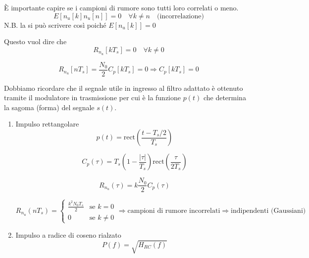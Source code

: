 È importante capire se i campioni di rumore sono tutti loro correlati o meno.
\[
    E[n_u[k]n_u[n]] = 0 \quad \forall k \neq n \quad \text{(incorrelazione)}
\]
N.B. la si può scrivere così poiché
\(E[n_u[k]] = 0\)

Questo vuol dire che
\[
    R_{n_u}[kT_s] = 0 \quad \forall k \neq 0
\]

\[
    R_{n_u}[nT_s] = \frac{N_0}{2} C_p[kT_s] = 0 \Rightarrow C_p[kT_s] = 0
\]


Dobbiamo ricordare che il segnale utile in ingresso al filtro adattato è ottenuto tramite il modulatore in trasmissione per cui è la funzione \( p(t) \) che determina la sagoma (forma) del segnale \( s(t) \).

\begin{enumerate}
    \item Impulso rettangolare
          \[
              p(t) = \text{rect}\left(\frac{t-T_s/2}{T_s}\right)
          \]

          \[
              C_p(\tau) = T_s \left(1 - \frac{|\tau|}{T_s}\right) \text{rect}\left(\frac{\tau}{2T_s}\right)
          \]

          \[
              R_{n_u}(\tau) = k \frac{N_0}{2} C_p(\tau)
          \]

          \[
              R_{n_u}(nT_s) =
              \begin{cases}
                  \frac{k^2 N_0 T_s}{2} & \text{se } k = 0    \\
                  0                     & \text{se } k \neq 0
              \end{cases}
              \Rightarrow
              \text{campioni di rumore incorrelati} \Rightarrow \text{indipendenti (Gaussiani)}
          \]
          \begin{center}

          \end{center}
    \item Impulso a radice di coseno rialzato
          \[
              P(f) = \sqrt{H_{RC}(f)}
          \]


\end{enumerate}
